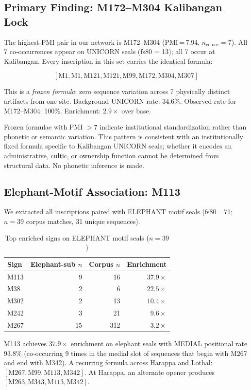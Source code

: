 \documentclass[12pt,letterpaper]{article}
\begin{document}
\subsection{Primary Finding: M172--M304 Kalibangan Lock}

The highest-PMI pair in our network is M172--M304 (PMI\,=\,7.94,
$n_{\text{co-occ}} = 7$).
All 7 co-occurrences appear on UNICORN seals (fs80 = 13);
all 7 occur at Kalibangan.
Every inscription in this set carries the identical formula:

\[
[\text{M1}, \text{M1}, \text{M121}, \text{M121}, \text{M99},
 \text{M172}, \text{M304}, \text{M307}]
\]

This is a \emph{frozen formula}: zero sequence variation across 7
physically distinct artifacts from one site.
Background UNICORN rate: 34.6\%.
Observed rate for M172--M304: 100\%.
Enrichment: $2.9\times$ over base.

Frozen formulae with PMI $>7$ indicate institutional standardization
rather than phonetic or semantic variation.
This pattern is consistent with an institutionally fixed formula
specific to Kalibangan UNICORN seals; whether it encodes an
administrative, cultic, or ownership function cannot be determined
from structural data.
No phonetic inference is made.

\subsection{Elephant-Motif Association: M113}

We extracted all inscriptions paired with ELEPHANT motif seals
(fs80\,=\,71; $n = 39$ corpus matches, 31 unique sequences).

\begin{table}[htbp]
\centering
\caption{Top enriched signs on ELEPHANT motif seals ($n = 39$)}
\begin{tabular}{lrrr}
\toprule
Sign & Elephant-sub $n$ & Corpus $n$ & Enrichment \\
\midrule
M113 & 9  & 16  & $37.9\times$ \\
M38  & 2  &  6  & $22.5\times$ \\
M302 & 2  & 13  & $10.4\times$ \\
M242 & 3  & 21  & $9.6\times$ \\
M267 & 15 & 312 & $3.2\times$ \\
\bottomrule
\end{tabular}
\end{table}

M113 achieves $37.9\times$ enrichment on elephant seals with MEDIAL
positional rate 93.8\% (co-occurring 9 times in the medial slot of
sequences that begin with M267 and end with M342).
A recurring formula across Harappa and Lothal:
$[\text{M267}, \text{M99}, \text{M113}, \text{M342}]$.
At Harappa, an alternate opener produces
$[\text{M263}, \text{M343}, \text{M113}, \text{M342}]$.
\end{document}
